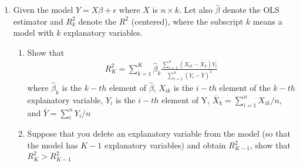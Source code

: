 \documentclass[12pt,onecolumn]{article}
\begin{document}
\begin{enumerate}
  \item Given the model $Y = X \beta + \epsilon$ where $X$ is $n \times k$. Let also $\hat \beta$ denote the OLS estimator and $R^2_k$ denote the  $R^2$ (centered), where the subscript $k$ means a model with $k$ explanatory variables.
  \begin{enumerate}
    \item Show that 
    \begin{align}
      R^2_K = \sum_{k=1}^K \hat \beta_k \frac{\sum_{i=1}^n (X_{ik}-\bar{X}_k)Y_i}{\sum_{i=1}^n (Y_i-\bar Y)^2}
    \end{align}
    where $\hat \beta_k$ is the $k-th$ element of $\hat \beta$, $X_{ik}$ is the $i-th$ element of the $k-th$ explanatory variable, $Y_i$ is the $i-th$ element of Y, $\bar X_k = \sum_{i=1}^n X_{ik}/n$, and $\bar Y = \sum_i^n Y_i/n$
    \item Suppose that you delete an explanatory variable from the model (so that the model has $K-1$ explanatory variables) and obtain $R^2_{K-1}$, show that $R^2_{K}>R^2_{K-1}$
  \end{enumerate}



\end{enumerate}
\end{document}
